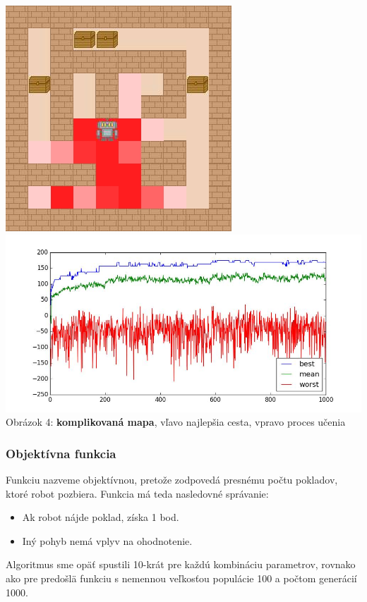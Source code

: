 \documentclass[10pt]{paper}
\begin{document}
\begin{center}
  \includegraphics[scale=0.4]{strategy1_complicated.png} 
  \includegraphics[scale=0.3]{strategy1_complicated_graph.png} \\
   Obrázok 4: \textbf{komplikovaná mapa}, vľavo najlepšia cesta, vpravo proces učenia
\end{center}

\subsubsection{Objektívna funkcia}
Funkciu nazveme objektívnou, pretože zodpovedá presnému počtu pokladov, ktoré robot pozbiera. Funkcia má teda nasledovné správanie:
\begin{itemize}[noitemsep]
\item Ak robot nájde poklad, získa 1 bod.
\item Iný pohyb nemá vplyv na ohodnotenie.
\end{itemize} 

Algoritmus sme opäť spustili 10-krát pre každú kombináciu parametrov, rovnako ako pre predošlä funkciu s nemennou veľkosťou populácie 100 a počtom generácií 1000.
\end{document}
